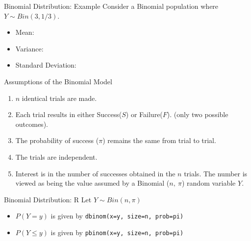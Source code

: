 \documentclass[
  ignorenonframetext,
]{beamer}
\providecommand{\tightlist}{%
  \setlength{\itemsep}{0pt}\setlength{\parskip}{0pt}}
\begin{document}
\begin{frame}{Binomial Distribution: Example}
\protect{}\label{binomial-distribution-example}
Consider a Binomial population where \(Y\sim Bin(3,1/3)\).

\begin{itemize}
\tightlist
\item
  Mean:
\end{itemize}

\hfill\break
\hfill\break
\hfill\break

\begin{itemize}
\tightlist
\item
  Variance:
\end{itemize}

\hfill\break
\hfill\break
\hfill\break

\begin{itemize}
\tightlist
\item
  Standard Deviation:
\end{itemize}
\end{frame}

\begin{frame}{Assumptions of the Binomial Model}
\protect{}\label{assumptions-of-the-binomial-model}
\begin{enumerate}
\item
  \(n\) identical trials are made.
\item
  Each trial results in either {Success(\(S\))} or {Failure(\(F\))}.
  (only two possible outcomes).
\item
  The probability of success (\(\pi\)) remains the same from trial to
  trial.
\item
  The trials are independent.
\item
  Interest is in the number of successes obtained in the \(n\) trials.
  The number is viewed as being the value assumed by a Binomial
  (\(n,\ \pi\)) random variable \(Y\).
\end{enumerate}
\end{frame}

\begin{frame}[fragile]{Binomial Distribution: R}
\protect{}\label{binomial-distribution-r}
Let \(Y\sim Bin(n,\pi)\)

\begin{itemize}
\tightlist
\item
  \(P(Y=y)\) is given by \texttt{dbinom(x=y,\ size=n,\ prob=pi)}
\item
  \(P(Y\leq y)\) is given by \texttt{pbinom(x=y,\ size=n,\ prob=pi)}
\end{itemize}
\end{frame}
\end{document}
